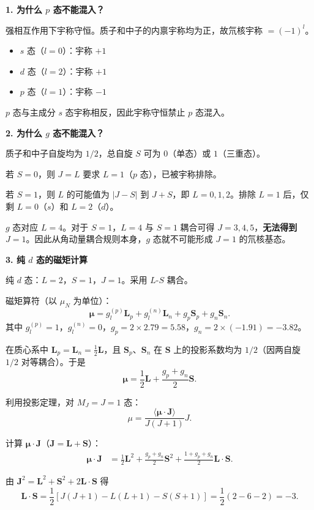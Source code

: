 \begin{derivationbox}[标准解题过程]
\textbf{1. 为什么 $p$ 态不能混入？}

强相互作用下宇称守恒。质子和中子的内禀宇称均为正，故氘核宇称 $=(-1)^l$。
\begin{itemize}
    \item $s$ 态（$l=0$）：宇称 $+1$
    \item $d$ 态（$l=2$）：宇称 $+1$
    \item $p$ 态（$l=1$）：宇称 $-1$
\end{itemize}
$p$ 态与主成分 $s$ 态宇称相反，因此宇称守恒禁止 $p$ 态混入。

\textbf{2. 为什么 $g$ 态不能混入？}

质子和中子自旋均为 $1/2$，总自旋 $S$ 可为 $0$（单态）或 $1$（三重态）。

若 $S=0$，则 $J=L$ 要求 $L=1$（$p$ 态），已被宇称排除。

若 $S=1$，则 $L$ 的可能值为 $|J-S|$ 到 $J+S$，即 $L=0,1,2$。排除 $L=1$ 后，仅剩 $L=0$（$s$）和 $L=2$（$d$）。

$g$ 态对应 $L=4$。对于 $S=1$，$L=4$ 与 $S=1$ 耦合可得 $J=3,4,5$，\textbf{无法得到 $J=1$}。因此从角动量耦合规则本身，$g$ 态就不可能形成 $J=1$ 的氘核基态。

\textbf{3. 纯 $d$ 态的磁矩计算}

纯 $d$ 态：$L=2$，$S=1$，$J=1$。采用 $L$-$S$ 耦合。

磁矩算符（以 $\mu_N$ 为单位）：
\[
\boldsymbol\mu=g_l^{(p)}\mathbf{L}_p+g_l^{(n)}\mathbf{L}_n+g_p\mathbf{S}_p+g_n\mathbf{S}_n.
\]
其中 $g_l^{(p)}=1$，$g_l^{(n)}=0$，$g_p=2\times2.79=5.58$，$g_n=2\times(-1.91)=-3.82$。

在质心系中 $\mathbf{L}_p=\mathbf{L}_n=\frac12\mathbf{L}$，且 $\mathbf{S}_p$、$\mathbf{S}_n$ 在 $\mathbf{S}$ 上的投影系数均为 $1/2$（因两自旋 $1/2$ 对等耦合）。于是
\[
\boldsymbol\mu=\frac12\mathbf{L}+\frac{g_p+g_n}{2}\mathbf{S}.
\]

利用投影定理，对 $M_J=J=1$ 态：
\[
\mu=\frac{\langle\boldsymbol\mu\cdot\mathbf{J}\rangle}{J(J+1)}J.
\]

计算 $\boldsymbol\mu\cdot\mathbf{J}$（$\mathbf{J}=\mathbf{L}+\mathbf{S}$）：
\begin{align*}
\boldsymbol\mu\cdot\mathbf{J}&=\frac12\mathbf{L}^2+\frac{g_p+g_n}{2}\mathbf{S}^2+\frac{1+g_p+g_n}{2}\mathbf{L}\cdot\mathbf{S}.
\end{align*}

由 $\mathbf{J}^2=\mathbf{L}^2+\mathbf{S}^2+2\mathbf{L}\cdot\mathbf{S}$ 得
\[
\mathbf{L}\cdot\mathbf{S}=\frac12[J(J+1)-L(L+1)-S(S+1)]=\frac12(2-6-2)=-3.
\]


\end{derivationbox}
